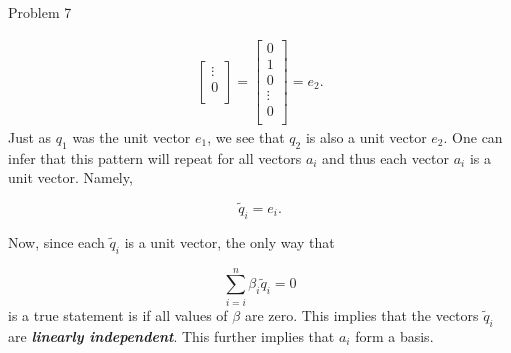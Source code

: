 \begin{problem}{Problem 7}
\begin{highlight}[Solution]
\begin{align}
\begin{bmatrix}
                \vdots \\
                0 \\
            \end{bmatrix}
            =
            \begin{bmatrix}
                0 \\
                1 \\
                0 \\
                \vdots \\
                0 \\
            \end{bmatrix}
            = e_{2}.
        \end{align}
        Just as $q_{1}$ was the unit vector $e_{1}$, we see that $q_{2}$ is also a unit vector $e_{2}$. One can infer that this pattern will repeat for all vectors $a_{i}$ and thus each vector $a_{i}$ 
        is a unit vector. Namely,

        \begin{equation}
            \tilde{q}_{i} = e_{i}.
        \end{equation}

        Now, since each $\tilde{q}_{i}$ is a unit vector, the only way that 

        \begin{equation}
            \sum_{i = i}^{n} \beta_{i}\tilde{q}_{i} = 0
        \end{equation}
        is a true statement is if all values of $\beta$ are zero. This implies that the vectors $\tilde{q}_{i}$ are \textit{\textbf{linearly independent}}. This further implies that $a_{i}$ form a basis.
    \end{highlight}
\end{problem}

